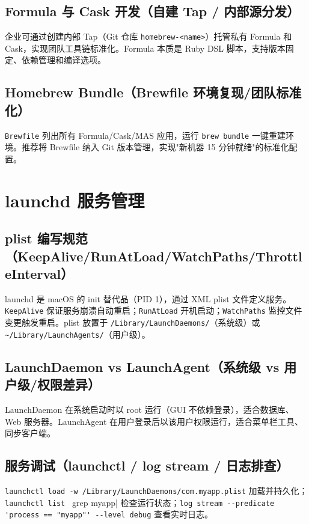 \documentclass[12pt,UTF8]{ctexbook}
\begin{document}
    \subsection{Formula 与 Cask 开发（自建 Tap / 内部源分发）}

企业可通过创建内部 Tap（Git 仓库 \verb|homebrew-<name>|）托管私有 Formula 和 Cask，实现团队工具链标准化。Formula 本质是 Ruby DSL 脚本，支持版本固定、依赖管理和编译选项。

    \subsection{Homebrew Bundle（Brewfile 环境复现/团队标准化）}

\verb|Brewfile| 列出所有 Formula/Cask/MAS 应用，运行 \verb|brew bundle| 一键重建环境。推荐将 Brewfile 纳入 Git 版本管理，实现"新机器 15 分钟就绪"的标准化配置。

  \section{launchd 服务管理}
    \subsection{plist 编写规范（KeepAlive/RunAtLoad/WatchPaths/ThrottleInterval）}

launchd 是 macOS 的 init 替代品（PID 1），通过 XML plist 文件定义服务。\verb|KeepAlive| 保证服务崩溃自动重启；\verb|RunAtLoad| 开机启动；\verb|WatchPaths| 监控文件变更触发重启。plist 放置于 \verb|/Library/LaunchDaemons/|（系统级）或 \verb|~/Library/LaunchAgents/|（用户级）。

    \subsection{LaunchDaemon vs LaunchAgent（系统级 vs 用户级/权限差异）}

LaunchDaemon 在系统启动时以 root 运行（GUI 不依赖登录），适合数据库、Web 服务器。LaunchAgent 在用户登录后以该用户权限运行，适合菜单栏工具、同步客户端。

    \subsection{服务调试（launchctl / log stream / 日志排查）}

\verb|launchctl load -w /Library/LaunchDaemons/com.myapp.plist| 加载并持久化；\verb|launchctl list | grep myapp| 检查运行状态；\verb|log stream --predicate 'process == "myapp"' --level debug| 查看实时日志。
\end{document}
